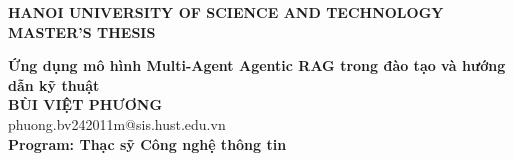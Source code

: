 \documentclass[Main.tex]{subfiles}
\begin{document}
\begin{titlepage}
\thispagestyle{empty}
\begin{center}

{\textbf{\large{HANOI UNIVERSITY OF SCIENCE AND TECHNOLOGY }}}\\[4cm]

{\textbf{\huge{MASTER'S THESIS}}}\\[1cm]
{\textbf{\Large{Ứng dụng mô hình Multi-Agent Agentic RAG trong đào tạo và hướng dẫn kỹ thuật}}\\[1cm]

{\textbf{\large{BÙI VIỆT PHƯƠNG}}}\\
{\large{phuong.bv242011m@sis.hust.edu.vn}}\\[0.5cm]

{\textbf{\large{Program: Thạc sỹ Công nghệ thông tin}}}\\

\vspace{2cm}
\begin{table}[H]
\centering
{}
\end{table}}
\end{center}



\end{titlepage}
\end{document}
